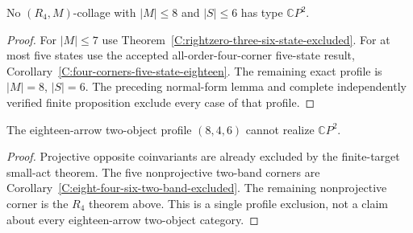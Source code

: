 \begin{theorem}
\label{C:eight-source-rightzero-three-six}
No $(R_4,M)$-collage with $|M|\leq8$ and $|S|\leq6$
has type $\mathbb CP^2$.
\end{theorem}
\begin{proof}
For $|M|\leq7$ use
Theorem~\ref{C:rightzero-three-six-state-excluded}.
For at most five states use the accepted all-order-four-corner
five-state result, Corollary~\ref{C:four-corners-five-state-eighteen}.
The remaining exact profile is $|M|=8$, $|S|=6$.
The preceding normal-form lemma and complete independently
verified finite proposition exclude every case of that profile.
\end{proof}

\begin{corollary}
\label{C:eight-four-six-excluded}
The eighteen-arrow two-object profile $(8,4,6)$ cannot
realize $\mathbb CP^2$.
\end{corollary}
\begin{proof}
Projective opposite coinvariants are already excluded by
the finite-target small-act theorem.  The five nonprojective
two-band corners are
Corollary~\ref{C:eight-four-six-two-band-excluded}.
The remaining nonprojective corner is the $R_4$ theorem above.
This is a single profile exclusion, not a claim about every
eighteen-arrow two-object category.
\end{proof}
